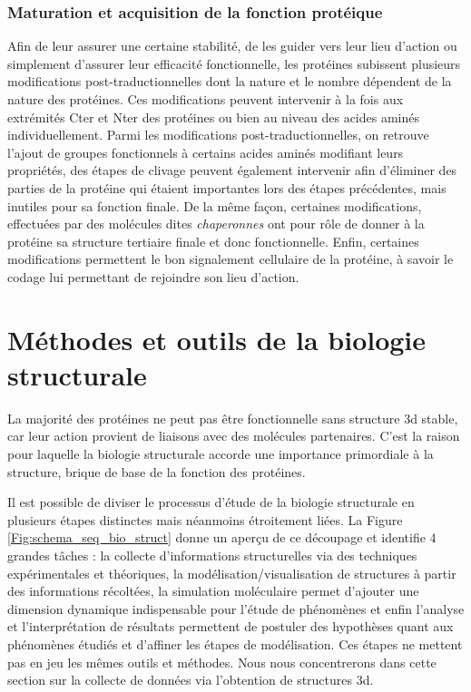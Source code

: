 \subsubsection{Maturation et acquisition de la fonction protéique}

Afin de leur assurer une certaine stabilité, de les guider vers leur lieu d'action ou simplement d'assurer leur efficacité fonctionnelle, les protéines subissent plusieurs modifications post-traductionnelles dont la nature et le nombre dépendent de la nature des protéines. Ces modifications peuvent intervenir à la fois aux extrémités Cter et Nter des protéines ou bien au niveau des acides aminés individuellement. Parmi les modifications post-traductionnelles, on retrouve l'ajout de groupes fonctionnels à certains acides aminés modifiant leurs propriétés, des étapes de clivage peuvent également intervenir afin d'éliminer des parties de la protéine qui étaient importantes lors des étapes précédentes, mais inutiles pour sa fonction finale. De la même façon, certaines modifications, effectuées par des molécules dites \textit{chaperonnes} ont pour rôle de donner à la protéine sa structure tertiaire finale et donc fonctionnelle. Enfin, certaines modifications permettent le bon signalement cellulaire de la protéine, à savoir le codage lui permettant de rejoindre son lieu d'action.

\section{Méthodes et outils de la biologie structurale}

La majorité des protéines ne peut pas être fonctionnelle sans structure 3d stable, car leur action provient de liaisons avec des molécules partenaires. C'est la raison pour laquelle la biologie structurale accorde une importance primordiale à la structure, brique de base de la fonction des protéines.

Il est possible de diviser le processus d'étude de la biologie structurale en plusieurs étapes distinctes mais néanmoins étroitement liées. La Figure \ref{Fig:schema_seq_bio_struct} donne un aperçu de ce découpage et identifie 4 grandes tâches : la collecte d'informations structurelles via des techniques expérimentales et théoriques, la modélisation/visualisation de structures à partir des informations récoltées, la simulation moléculaire permet d'ajouter une dimension dynamique indispensable pour l'étude de phénomènes et enfin l'analyse et l'interprétation de résultats permettent de postuler des hypothèses quant aux phénomènes étudiés et d'affiner les étapes de modélisation.
Ces étapes ne mettent pas en jeu les mêmes outils et méthodes. Nous nous concentrerons dans cette section sur la collecte de données via l'obtention de structures 3d.

